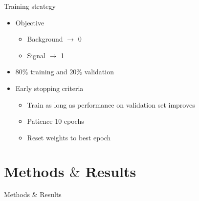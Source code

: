 \documentclass[UKenglish]{beamer}
\begin{document}
\begin{frame}{Training strategy}
    \begin{itemize}
        \item Objective
        \begin{itemize}
            \item Background $\rightarrow$ 0 
            \item Signal $\rightarrow$ 1
        \end{itemize}
        \item $80\%$ training and $20\%$ validation 
        \item Early stopping criteria
        \begin{itemize}
            \item Train as long as performance on validation set improves 
            \item Patience 10 epochs
            \item Reset weights to best epoch
        \end{itemize}
    \end{itemize}
\end{frame}



\section{Methods $\&$ Results}
\begin{frame}{Methods $\&$ Results}
    \tableofcontents[currentsection]
\end{frame}



\end{document}
